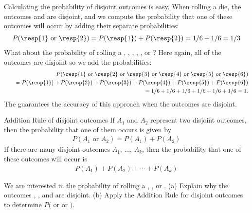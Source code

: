 Calculating the probability of disjoint outcomes is easy. When rolling a die, the outcomes  and  are disjoint, and we compute the probability that one of these outcomes will occur by adding their separate probabilities:
\begin{eqnarray*}
P(\text{\resp{1} or \resp{2}}) = P(\text{\resp{1}})+P(\text{\resp{2}}) = 1/6 + 1/6 = 1/3
\end{eqnarray*}
What about  the probability of rolling a , , , , , or ? Here again, all of the outcomes are disjoint so we add the probabilities:
\begin{eqnarray*}
&&P(\text{\resp{1} or \resp{2} or \resp{3} or \resp{4} or \resp{5} or \resp{6}}) \\
	&&\quad= P(\text{\resp{1}})+P(\text{\resp{2}})+P(\text{\resp{3}})+P(\text{\resp{4}})+P(\text{\resp{5}})+P(\text{\resp{6}}) \\
	&&\quad= 1/6 + 1/6 + 1/6 + 1/6 + 1/6 + 1/6 = 1.
\end{eqnarray*}
The  guarantees the accuracy of this approach when the outcomes are disjoint. 

\begin{onebox}{Addition Rule of disjoint outcomes} If $A_1$ and $A_2$ represent two disjoint outcomes, then the probability that one of them occurs is given by
\begin{eqnarray*}
P(A_1\text{ or } A_2) = P(A_1) + P(A_2)
\end{eqnarray*}
If there are many disjoint outcomes $A_1$, ..., $A_k$, then the probability that one of these outcomes will occur is
\begin{eqnarray}
P(A_1) + P(A_2) + \cdots + P(A_k)
\end{eqnarray}

\end{onebox}

\begin{exercisewrap}
\begin{nexercise}
We are interested in the probability of rolling a , , or . (a) Explain why the outcomes , , and  are disjoint. (b) Apply the Addition Rule for disjoint outcomes to determine $P($ or  or $)$.\footnotemark
\end{nexercise}
\end{exercisewrap}


